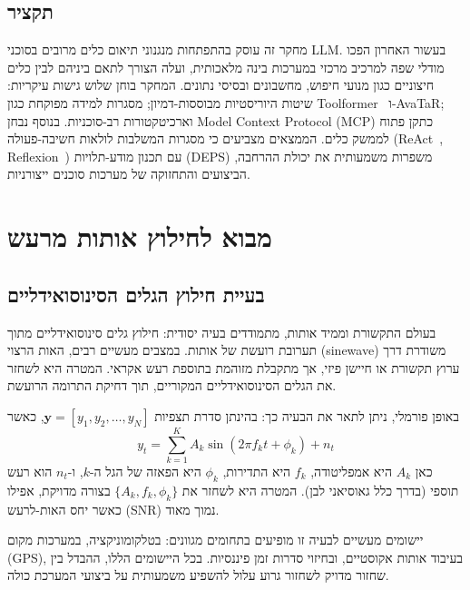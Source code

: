 \section*{תקציר}

מחקר זה עוסק בהתפתחות מנגנוני תיאום כלים מרובים בסוכני \textenglish{LLM}. בעשור האחרון הפכו מודלי שפה למרכיב מרכזי במערכות בינה מלאכותית, ועלה הצורך לתאם ביניהם לבין כלים חיצוניים כגון מנועי חיפוש, מחשבונים ובסיסי נתונים. המחקר בוחן שלוש גישות עיקריות: שיטות היוריסטיות מבוססות-דמיון; מסגרות למידה מפוקחת כגון \textenglish{Toolformer}~\cite{schick2023toolformer} ו-\textenglish{AvaTaR}; וארכיטקטורות רב-סוכניות. בנוסף נבחן \textenglish{Model Context Protocol} (\textenglish{MCP}) כתקן פתוח לממשק כלים. הממצאים מצביעים כי מסגרות המשלבות לולאות חשיבה-פעולה (\textenglish{ReAct}~\cite{yao2023react}, \textenglish{Reflexion}~\cite{shinn2023reflexion}) עם תכנון מודע-תלויות (\textenglish{DEPS}) משפרות משמעותית את יכולת ההרחבה, הביצועים והתחזוקה של מערכות סוכנים ייצורניות.

\chapter{מבוא לחילוץ אותות מרעש}

\section{בעיית חילוץ הגלים הסינוסואידליים}

בעולם התקשורת וממיד אותות, מתמודדים בעיה יסודית: חילוץ גלים סינוסואידליים מתוך תערובת רועשת של אותות. במצבים מעשיים רבים, האות הרצוי (sinewave) משודרת דרך ערוץ תקשורת או חיישן פיזי, אך מתקבלת מזוהמת בתוספת רעש אקראי. המטרה היא לשחזר את הגלים הסינוסואידליים המקוריים, תוך דחיקת התרומה הרועשת.

באופן פורמלי, ניתן לתאר את הבעיה כך: בהינתן סדרת תצפיות $\mathbf{y} = [y_1, y_2, \ldots, y_N]$, כאשר
\begin{equation}
y_t = \sum_{k=1}^{K} A_k \sin(2\pi f_k t + \phi_k) + n_t
\end{equation}
כאן $A_k$ היא אמפליטודה, $f_k$ היא התדירות, $\phi_k$ היא הפאזה של הגל ה-$k$, ו-$n_t$ הוא רעש תוספי (בדרך כלל גאוסיאני לבן). המטרה היא לשחזר את $\{A_k, f_k, \phi_k\}$ בצורה מדויקת, אפילו כאשר יחס האות-לרעש (SNR) נמוך מאוד.

יישומים מעשיים לבעיה זו מופיעים בתחומים מגוונים: בטלקומוניקציה, במערכות מקום (GPS), בעיבוד אותות אקוסטיים, ובחיזוי סדרות זמן פיננסיות. בכל היישומים הללו, ההבדל בין שחזור מדויק לשחזור גרוע עלול להשפיע משמעותית על ביצועי המערכת כולה.

